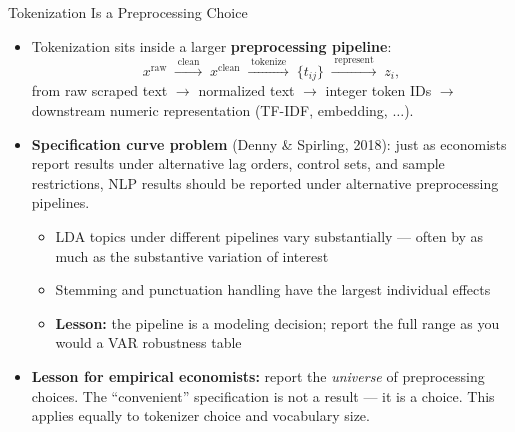 \documentclass[10pt,english,aspectratio=169]{beamer}
\begin{document}
\begin{frame}{Tokenization Is a Preprocessing Choice}
\begin{itemize}
\item Tokenization sits inside a larger \textbf{preprocessing pipeline}:
\[
   x^{\text{raw}} \;\xrightarrow{\;\text{clean}\;}\; x^{\text{clean}}
   \;\xrightarrow{\;\text{tokenize}\;}\; \{t_{ij}\}
   \;\xrightarrow{\;\text{represent}\;}\; z_i,
\]
from raw scraped text $\to$ normalized text $\to$ integer token IDs $\to$ downstream numeric representation (TF-IDF, embedding, $\ldots$).

\medskip
\item \textbf{Specification curve problem} (Denny \& Spirling, 2018): just as economists report results under alternative lag orders, control sets, and sample restrictions, NLP results should be reported under alternative preprocessing pipelines.
\begin{itemize}
    \item LDA topics under different pipelines vary substantially --- often by as much as the substantive variation of interest
    \item Stemming and punctuation handling have the largest individual effects
    \item \textbf{Lesson:} the pipeline is a modeling decision; report the full range as you would a VAR robustness table
\end{itemize}

\medskip
\item \textbf{Lesson for empirical economists:} report the \emph{universe} of preprocessing choices. The ``convenient'' specification is not a result --- it is a choice. This applies equally to tokenizer choice and vocabulary size.
\end{itemize}
\end{frame}
\end{document}
